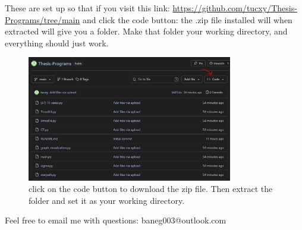 These are set up so that if you visit this link: \url{https://github.com/tucxy/Thesis-Programs/tree/main} and click the code button: the .zip file installed will when extracted will give you a folder. Make that folder your working directory, and everything should just work.

\begin{figure}[H]
  \begin{center}
  \includegraphics[width=0.8\textwidth]{standalone/Images/guide.JPG}
  \caption{click on the code button to download the zip file. Then extract the folder and set it as your working directory.}
  \label{fig:CPsnippet}
  \end{center}
\end{figure}

Feel free to email me with questions: baneg003@outlook.com